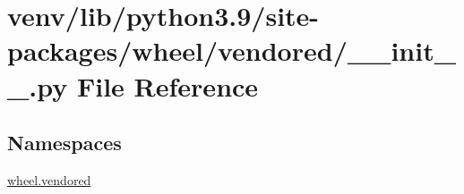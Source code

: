 \hypertarget{venv_2lib_2python3_89_2site-packages_2wheel_2vendored_2____init_____8py}{}\section{venv/lib/python3.9/site-\/packages/wheel/vendored/\+\_\+\+\_\+init\+\_\+\+\_\+.py File Reference}
\label{venv_2lib_2python3_89_2site-packages_2wheel_2vendored_2____init_____8py}
\subsection*{Namespaces}
\begin{DoxyCompactItemize}
\item 
 \hyperlink{namespacewheel_1_1vendored}{wheel.\+vendored}
\end{DoxyCompactItemize}
